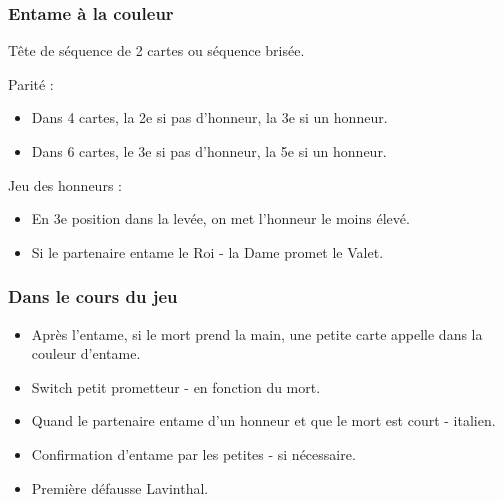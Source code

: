 \documentclass[a4paper]{article}
\begin{document}
\subsubsection{Entame à la couleur}

Tête de séquence de 2 cartes ou séquence brisée.

Parité :

\begin{itemize}
\item Dans 4 cartes, la 2e si pas d'honneur, la 3e si un honneur.

\item Dans 6 cartes, le 3e si pas d'honneur, la 5e si un honneur.

\end{itemize}

Jeu des honneurs :

\begin{itemize}
\item En 3e position dans la levée, on met l'honneur le moins élevé.

\item Si le partenaire entame le Roi - la Dame promet le Valet.

\end{itemize}

\subsubsection{Dans le cours du jeu}

\begin{itemize}
\item Après l'entame, si le mort prend la main, une petite carte appelle dans la couleur d'entame.

\item Switch petit prometteur - en fonction du mort.

\item Quand le partenaire entame d'un honneur et que le mort est court - italien.

\item Confirmation d'entame par les petites - si nécessaire.

\item Première défausse Lavinthal.

\end{itemize}
\end{document}
